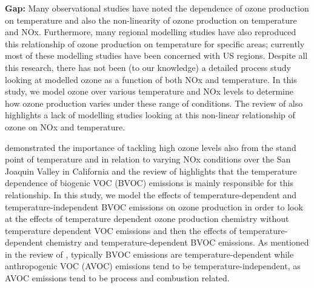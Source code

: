 \textbf{Gap:}
Many observational studies have noted the dependence of ozone production on temperature and also the non-linearity of ozone production on temperature and NOx.
Furthermore, many regional modelling studies have also reproduced this relationship of ozone production on temperature for specific areas; currently most of these modelling studies have been concerned with US regions.
Despite all this research, there has not been (to our knowledge) a detailed process study looking at modelled ozone as a function of both NOx and temperature.
In this study, we model ozone over various temperature and NOx levels to determine how ozone production varies under these range of conditions.
The review of \citet{Pusede:2015} also highlights a lack of modelling studies looking at this non-linear relationship of ozone on NOx and temperature.

\citet{Pusede:2014} demonstrated the importance of tackling high ozone levels also from the stand point of temperature and in relation to varying NOx conditions over the San Joaquin Valley in California and the review of \citet{Pusede:2015} highlights that the temperature dependence of biogenic VOC (BVOC) emissions is mainly responsible for this relationship.
In this study, we model the effects of temperature-dependent and temperature-independent BVOC emissions on ozone production in order to look at the effects of temperature dependent ozone production chemistry without temperature dependent VOC emissions and then the effects of temperature-dependent chemistry and temperature-dependent BVOC emissions.
As mentioned in the review of \citet{Pusede:2015}, typically BVOC emissions are temperature-dependent while anthropogenic VOC (AVOC) emissions tend to be temperature-independent, as AVOC emissions tend to be process and combustion related.
